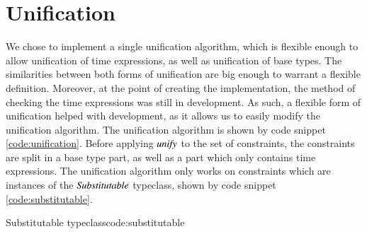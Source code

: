 \section{Unification}
We chose to implement a single unification algorithm, which is flexible enough to allow unification of time expressions, as well as unification of base types.
The similarities between both forms of unification are big enough to warrant a flexible definition.
Moreover, at the point of creating the implementation, the method of checking the time expressions was still in development.
As such, a flexible form of unification helped with development, as it allows us to easily modify the unification algorithm.
The unification algorithm is shown by code snippet \ref{code:unification}.
Before applying \ensuremath{\Varid{unify}} to the set of constraints, the constraints are split in a base type part, as well as a part which only contains time expressions.
The unification algorithm only works on constraints which are instances of the \ensuremath{\Conid{Substitutable}} typeclass, shown by code snippet \ref{code:substitutable}.

\begin{texexptitled}{Substitutable typeclass}{code:substitutable}
\resethooks
\end{texexptitled}

